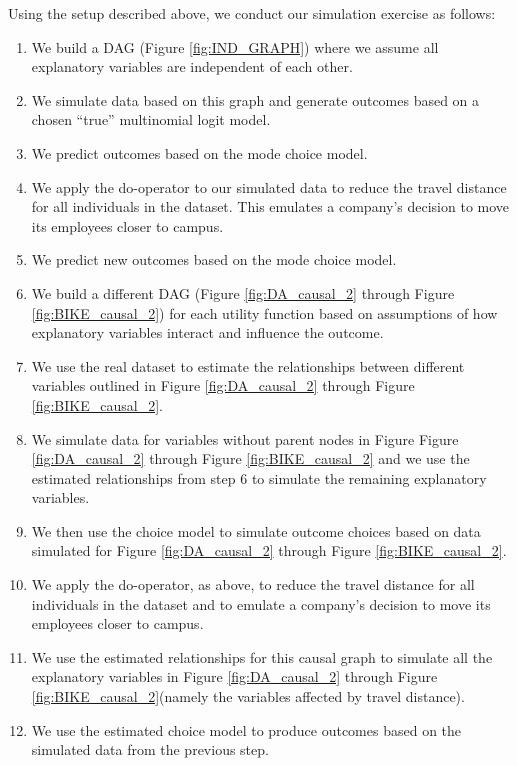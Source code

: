 Using the setup described above, we conduct our simulation exercise as follows:
\begin{enumerate}

\item We build a DAG (Figure \ref{fig:IND_GRAPH}) where we assume all explanatory variables are independent of each other. 
\item We simulate data based on this graph and generate outcomes based on a chosen ``true'' multinomial logit model.
\item We predict outcomes based on the mode choice model.
\item We apply the do-operator \citet{pearl_causality_2000} to our simulated data to reduce the travel distance for all individuals in the dataset. This emulates a company's decision to move its employees closer to campus.
\item We predict new outcomes based on the mode choice model.\newline
\item We build a different DAG (Figure \ref{fig:DA_causal_2} through Figure \ref{fig:BIKE_causal_2}) for each utility function based on assumptions of how explanatory variables interact and influence the outcome.
\item We use the real dataset to estimate the relationships between different variables outlined in Figure \ref{fig:DA_causal_2} through Figure \ref{fig:BIKE_causal_2}.
\item We simulate data for variables without parent nodes in Figure Figure \ref{fig:DA_causal_2} through Figure \ref{fig:BIKE_causal_2} and we use the estimated relationships from step 6 to simulate the remaining explanatory variables.
\item We then use the choice model to simulate outcome choices based on data simulated for Figure \ref{fig:DA_causal_2} through Figure \ref{fig:BIKE_causal_2}.
\item We apply the do-operator, as above, to reduce the travel distance for all individuals in the dataset and to emulate a company's decision to move its employees closer to campus.
\item We use the estimated relationships for this causal graph to simulate all the explanatory variables in Figure \ref{fig:DA_causal_2} through Figure \ref{fig:BIKE_causal_2}(namely the variables affected by travel distance).
\item We use the estimated choice model to produce outcomes based on the simulated data from the previous step.

\end{enumerate}

